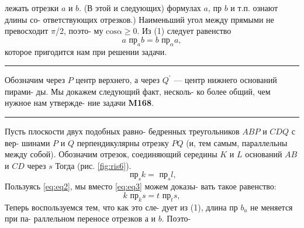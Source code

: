 \documentclass[12pt]{article}
\begin{document}
\begin{multicols}{2}
\parindent0pt
лежать отрезки $a$ и $b$. (В этой и следующих)\linebreak
формулах $a$, пр $b$ и т.п. ознают длины со-\linebreak
ответствующих отрезков.) Наименьший угол\linebreak
между прямыми не превосходит $\pi$/2, поэто-\linebreak
му $\mathrm{cos\alpha \ge 0}$. Из (1) следует равенство \\
\setcounter{equation}{1}
\begin{equation}
    \label{eq:eq2}
    a \text{ пр}_{a}{b} = b \text{ пр}_{\alpha}a,
\end{equation}
которое пригодится нам при решении задачи.\linebreak
\rule{0.85cm} ООбозначим через $P$ центр верхнего, а\linebreak
через $Q^{\prime}$ — центр нижнего оснований пирами-\linebreak
ды. Мы докажем следующий факт, несколь-\linebreak
ко более общий, чем нужное нам утвержде-\linebreak
ние задачи \textbf{M168}. \\
\rule{0.85cm} ППусть плоскости двух подобных равно-\linebreak
бедренных треугольников $ABP$ и $CDQ$ с вер-\linebreak
шинами $P$ и $Q$ перпендикулярны отрезку $PQ$\linebreak
(и, тем самым, параллельны между собой).\linebreak
Обозначим отрезок, соединяющий середины\linebreak
$K$ и $L$ оснований $AB$ и $CD$ через $s$ Тогда\linebreak
(рис. \ref{fig:ris6}).
\begin{equation}
    \label{eq:eq3}
    \text{ пр}_{s}{k} = \text{ пр}_{s}{l},
\end{equation}
Пользуясь \eqref{eq:eq2}, мы вместо \eqref{eq:eq3} можем доказы-\linebreak
вать такое равенство:
\begin{equation}
    \label{eq:eq4}
    k \text{ пр}_{k}{s} = t\text{ пр}_{t}{s},
\end{equation}
Теперь воспользуемся тем, что как это сле-\linebreak
дует из (1), длина пр $b_{a}$ не меняется при па-\linebreak
раллельном переносе отрезков $а$ и $b$. Поэто-\linebreak

\end{multicols}
\end{document}
